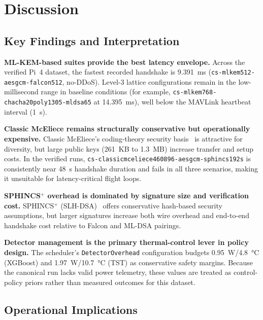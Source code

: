 \documentclass[conference]{IEEEtran}
\begin{document}
\FloatBarrier
\section{Discussion}
\label{sec:discussion}

\subsection{Key Findings and Interpretation}

\textbf{ML-KEM-based suites provide the best latency envelope.}
Across the verified Pi~4 dataset, the fastest recorded handshake is \SI{9.391}{\milli\second} (\texttt{cs-mlkem512-aesgcm-falcon512}, no-DDoS).
Level-3 lattice configurations remain in the low-millisecond range in baseline conditions (for example, \texttt{cs-mlkem768-chacha20poly1305-mldsa65} at \SI{14.395}{\milli\second}), well below the MAVLink heartbeat interval (\SI{1}{\second}).

\textbf{Classic McEliece remains structurally conservative but operationally expensive.}
Classic McEliece's coding-theory security basis~\cite{mceliece} is attractive for diversity, but large public keys (261~KB to 1.3~MB) increase transfer and setup costs.
In the verified runs, \texttt{cs-classicmceliece460896-aesgcm-sphincs192s} is consistently near \SI{48}{\second} handshake duration and fails in all three scenarios, making it unsuitable for latency-critical flight loops.

\textbf{SPHINCS$^+$ overhead is dominated by signature size and verification cost.}
SPHINCS$^+$ (SLH-DSA)~\cite{sphincsplus} offers conservative hash-based security assumptions, but larger signatures increase both wire overhead and end-to-end handshake cost relative to Falcon and ML-DSA pairings.

\textbf{Detector management is the primary thermal-control lever in policy design.}
The scheduler's \texttt{DetectorOverhead} configuration budgets \SI{0.95}{\watt}/\SI{4.8}{\celsius} (XGBoost) and \SI{1.97}{\watt}/\SI{10.7}{\celsius} (TST) as conservative safety margins.
Because the canonical run lacks valid power telemetry, these values are treated as control-policy priors rather than measured outcomes for this dataset.

\subsection{Operational Implications}
\end{document}
